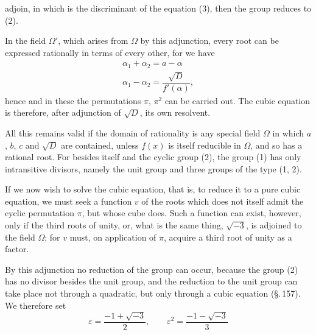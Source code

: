 
adjoin, in which
is the discriminant of the equation (3), then the group reduces
to (2).

In the field $\Omega'$, which arises from $\Omega$ by this
adjunction, every root can be expressed rationally in terms of every
other, for we have
\[
\begin{gathered}
\alpha_1 + \alpha_2 = a - \alpha\\
\alpha_1 - \alpha_2 = \dfrac{\sqrt{D}}{f'(\alpha)},
\end{gathered}
\]
hence
and in these the permutations $\pi$, $\pi^2$ can be carried out.
The cubic equation is therefore, after adjunction of $\sqrt{D}$,
its own  resolvent.

All this remains valid if the domain of rationality is any
special field $\Omega$ in which $a$, $b$, $c$ and
$\sqrt{D}$ are contained, unless $f(x)$ is itself reducible in
$\Omega$, and so has a rational root. For besides itself
and the cyclic group (2), the group (1) has only
intransitive divisors, namely the unit group and three groups
of the type (1, 2).

If we now wish to solve the cubic equation, that is, to reduce it
to a pure cubic equation, we must seek a
function $v$ of the roots which does not itself admit the cyclic
permutation $\pi$, but whose cube does. Such a function
can exist, however, only if the third roots of unity, or, what
is the same thing, $\sqrt{-3}$, is adjoined to the field $\Omega$; for
$v$ must, on application of $\pi$, acquire a third root of unity as
a factor.

By this adjunction no reduction of the group can
occur, because the group (2) has no divisor besides the
unit group, and the reduction to the unit group can
take place not through a quadratic, but only through a cubic
equation (\S.\,157). We therefore set
\[
\varepsilon = \dfrac{-1+\sqrt{-3}}{2}, \qquad
\varepsilon^2 = \dfrac{-1-\sqrt{-3}}{3}
\]
